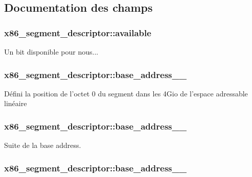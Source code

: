 \subsection{Documentation des champs}
\hypertarget{structx86__segment__descriptor_a761494a7a460e493e0d5d188a31cd052}{
\subsubsection[{available}]{ x86\+\_\+segment\+\_\+descriptor\+::available}}\label{structx86__segment__descriptor_a761494a7a460e493e0d5d188a31cd052}
Un bit disponible pour nous... \hypertarget{structx86__segment__descriptor_a6cd0f49e21060fadba677c3b41685ebf}{
\subsubsection[{base\+\_\+address\+\_\+15\+\_\+0}]{ x86\+\_\+segment\+\_\+descriptor\+::base\+\_\+address\+\_\+\_}}\label{structx86__segment__descriptor_a6cd0f49e21060fadba677c3b41685ebf}
Défini la position de l'octet 0 du segment dans les 4\+Gio de l'espace adressable linéaire \hypertarget{structx86__segment__descriptor_a95889fcbabf116ba15a6cea3364b903d}{
\subsubsection[{base\+\_\+address\+\_\+23\+\_\+16}]{ x86\+\_\+segment\+\_\+descriptor\+::base\+\_\+address\+\_\+\_}}\label{structx86__segment__descriptor_a95889fcbabf116ba15a6cea3364b903d}
Suite de la base address. \hypertarget{structx86__segment__descriptor_af839dd21992c16573ea5b816b72f249f}{
\subsubsection[{base\+\_\+address\+\_\+31\+\_\+24}]{ x86\+\_\+segment\+\_\+descriptor\+::base\+\_\+address\+\_\+\_}}\label{structx86__segment__descriptor_af839dd21992c16573ea5b816b72f249f}
